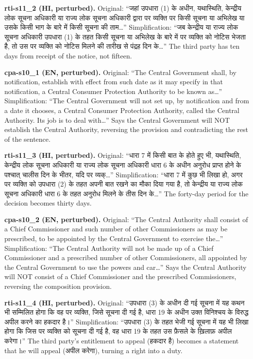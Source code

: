 \documentclass[conference]{IEEEtran}
\newcommand{\dev}[1]{{\devfont #1}}
\begin{document}
{\footnotesize
\noindent\textbf{rti-s11\_2 (HI, perturbed).} Original: “\dev{जहां उपधारा (1) के अधीन, यथास्थिति, केन्द्रीय लोक सूचना अधिकारी या राज्य लोक सूचना अधिकारी द्वारा पर व्यक्ति पर किसी सूचना या अभिलेख या उसके किसी भाग के बारे में किसी सूचना की ताम}…”  Simplification: “\dev{जब केन्द्रीय या राज्य लोक सूचना अधिकारी उपधारा (1) के तहत किसी सूचना या अभिलेख के बारे में पर व्यक्ति को नोटिस भेजता है, तो उस पर व्यक्ति को नोटिस मिलने की तारीख से पंद्रह दिन के}…”  The third party has ten days from receipt of the notice, not fifteen.

\noindent\textbf{cpa-s10\_1 (EN, perturbed).} Original: “The Central Government shall, by notification, establish with effect from such date as it may specify in that notification, a Central Consumer Protection Authority to be known as…”  Simplification: “The Central Government will not set up, by notification and from a date it chooses, a Central Consumer Protection Authority, called the Central Authority. Its job is to deal with…”  Says the Central Government will NOT establish the Central Authority, reversing the provision and contradicting the rest of the sentence.

\noindent\textbf{rti-s11\_3 (HI, perturbed).} Original: “\dev{धारा 7 में किसी बात के होते हुए भी, यथास्थिति, केन्द्रीय लोक सूचना अधिकारी या राज्य लोक सूचना अधिकारी धारा 6 के अधीन अनुरोध प्राप्त होने के पश्चात् चालीस दिन के भीतर, यदि पर व्यक्}…”  Simplification: “\dev{धारा 7 में कुछ भी लिखा हो, अगर पर व्यक्ति को उपधारा (2) के तहत अपनी बात रखने का मौका दिया गया है, तो केन्द्रीय या राज्य लोक सूचना अधिकारी धारा 6 के तहत अनुरोध मिलने के तीस दिन के}…”  The forty-day period for the decision becomes thirty days.

\noindent\textbf{cpa-s10\_2 (EN, perturbed).} Original: “The Central Authority shall consist of a Chief Commissioner and such number of other Commissioners as may be prescribed, to be appointed by the Central Government to exercise the…”  Simplification: “The Central Authority will not be made up of a Chief Commissioner and a prescribed number of other Commissioners, all appointed by the Central Government to use the powers and car…”  Says the Central Authority will NOT consist of a Chief Commissioner and the prescribed Commissioners, reversing the composition provision.

\noindent\textbf{rti-s11\_4 (HI, perturbed).} Original: “\dev{उपधारा (3) के अधीन दी गई सूचना में यह कथन भी सम्मिलित होगा कि वह पर व्यक्ति, जिसे सूचना दी गई है, धारा 19 के अधीन उक्त विनिश्चय के विरुद्ध अपील करने का हकदार है।}”  Simplification: “\dev{उपधारा (3) के तहत भेजी गई सूचना में यह भी लिखा होगा कि जिस पर व्यक्ति को सूचना दी गई है, वह धारा 19 के तहत उस फ़ैसले के ख़िलाफ़ अपील करेगा।}”  The third party's entitlement to appeal (\dev{हकदार है}) becomes a statement that he will appeal (\dev{अपील करेगा}), turning a right into a duty.

}
\end{document}
